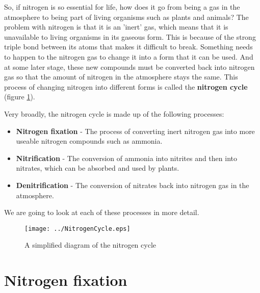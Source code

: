 So, if nitrogen is so essential for life, how does it go from being a gas in the atmosphere to being part of living organisms such as plants and animals? The problem with nitrogen is that it is an 'inert' gas, which means that it is unavailable to living organisms in its gaseous form. This is because of the strong triple bond between its atoms that makes it difficult to break. Something needs to happen to the nitrogen gas to change it into a form that it can be used. And at some later stage, these new compounds must be converted back into nitrogen gas so that the amount of nitrogen in the atmosphere stays the same. This process of changing nitrogen into different forms is called the \textbf{nitrogen cycle} (figure \ref{fig:global cycles:nitrogen cycle}). 


Very broadly, the nitrogen cycle is made up of the following processes:

\begin{itemize}
\item{\textbf{Nitrogen fixation} - The process of converting inert nitrogen gas into more useable nitrogen compounds such as ammonia.}
\item{\textbf{Nitrification} - The conversion of ammonia into nitrites and then into nitrates, which can be absorbed and used by plants.}
\item{\textbf{Denitrification} - The conversion of nitrates back into nitrogen gas in the atmosphere.}
\end{itemize}

We are going to look at each of these processes in more detail. 

\begin{figure}[htbp]
\begin{center}
\texttt{[image: ../NitrogenCycle.eps]}
\end{center}
\caption{A simplified diagram of the nitrogen cycle}
\label{fig:global cycles:nitrogen cycle}
\end{figure}






\section{Nitrogen fixation}
\label{sec:global cycles: nitrogen fixation}

